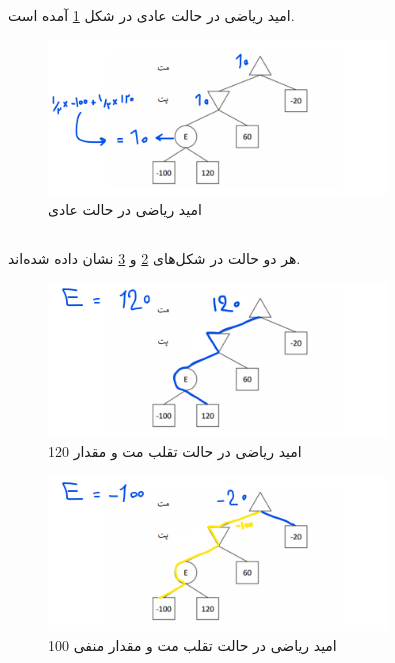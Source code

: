 \documentclass{university}
\begin{document}
\setupdocument

\section{}

\subsection{}
امید ریاضی در حالت عادی در شکل 
\ref{fig:eNormal}
آمده است.

\begin{figure}[htbp]
    \centering
    \includegraphics[width=0.8\textwidth]{assets/a.png}
    \caption{امید ریاضی در حالت عادی}
    \label{fig:eNormal}
\end{figure}

\subsection{}
هر دو حالت در شکل‌های 
\ref{fig:eOneHundredTwenty}
و
\ref{fig:minusOneHundred}
نشان داده شده‌اند. 

\begin{figure}[htbp]
    \centering
    \includegraphics[width=0.8\textwidth]{assets/b120.png}
    \caption{امید ریاضی در حالت تقلب مت و مقدار 120}
    \label{fig:eOneHundredTwenty}
\end{figure}
\begin{figure}[htbp]
    \centering
    \includegraphics[width=0.8\textwidth]{assets/b-100.png}
    \caption{امید ریاضی در حالت تقلب مت و مقدار منفی 100}
    \label{fig:minusOneHundred}
\end{figure}
\end{document}
